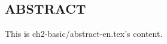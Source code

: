 \begin{ujnabstract*}
\section{ABSTRACT}
This is ch2-basic/abstract-en.tex's content.
\end{ujnabstract*}
